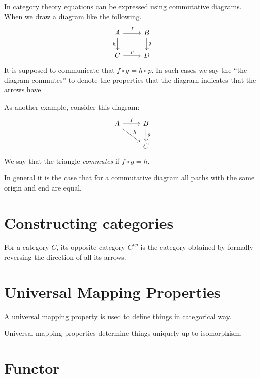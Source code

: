 \documentclass{book}
\theoremstyle{definition}
\begin{document}
In category theory equations can be expressed using commutative diagrams. When
we draw a diagram like the following.
\[
\begin{tikzcd}
  A \arrow[r, "f"] \arrow[d, "h"']
  & B \arrow[d, "g"] \\
  C \arrow[r, "p"] & D
\end{tikzcd}
\]
It is supposed to communicate that $f \circ g = h \circ p$. In such cases we
say the ``the diagram commutes'' to denote the properties that the diagram
indicates that the arrows have.

As another example, consider this diagram:
\[
  \begin{tikzcd}
    A \arrow[r, "f"] \arrow[dr, "h"] & B \arrow[d, "g"] \\
                                     & C
  \end{tikzcd}
\]
We say that the triangle \emph{commutes} if $f \circ g = h$.

In general it is the case that for a commutative diagram all paths with the same
origin and end are equal.

\section{Constructing categories}

For a category $C$, its opposite category $C^{op}$ is the category obtained by
formally reversing the direction of all its arrows.


\section{Universal Mapping Properties}

A universal mapping property is used to define things in categorical way.

Universal mapping properties determine things uniquely up to isomorphism.

\section{Functor}
\end{document}
